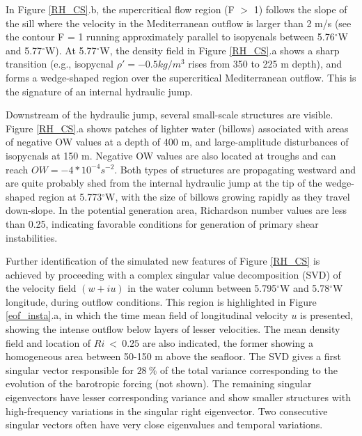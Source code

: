 In Figure \ref{RH_CS}.b, the supercritical flow region (F $>$ 1)  follows the slope of the sill where the velocity in the Mediterranean outflow is larger than 2 m/s (see the contour F = 1 running approximately parallel to isopycnals between 5.76$^\circ$W and 5.77$^\circ$W). At 5.77$^\circ$W, the density field in Figure \ref{RH_CS}.a shows a sharp transition (e.g., isopycnal $\rho'=-0.5kg/m^3$ rises from 350 to 225 m depth), and forms a wedge-shaped region over the supercritical Mediterranean outflow. This is the signature of an internal hydraulic jump. 

Downstream of the hydraulic jump, several small-scale structures are visible. Figure \ref{RH_CS}.a shows patches of lighter water (billows) associated with areas of negative OW values at a depth of 400 m, and large-amplitude disturbances of isopycnals at 150 m. Negative OW values are also located at troughs and can reach $OW=-4*10^{-4} s^{-2} $. Both types of structures are propagating westward and are quite probably shed from the internal hydraulic jump at the tip of the wedge-shaped region at 5.773$^\circ$W, with the size of billows growing rapidly as they travel down-slope. In the potential generation area, Richardson number values are less than 0.25, indicating favorable conditions for generation of primary shear instabilities. 

Further identification of the simulated new features of Figure \ref{RH_CS} is achieved by proceeding with a complex singular value decomposition (SVD) \citep{Pairaud2005} of the velocity field $(w+iu)$ in the water column between 5.795$^\circ$W and 5.78$^\circ$W longitude, during outflow conditions. This region is highlighted in Figure \ref{eof_insta}.a, in which the time mean field of longitudinal velocity $u$ is presented, showing the intense outflow below layers of lesser velocities. The mean density field and location of $Ri\ <\ 0.25$ are also indicated, the former showing a homogeneous area between 50-150 m above the seafloor. The SVD gives a first singular vector responsible for $28\ \%$ of the total variance corresponding to the evolution of the barotropic forcing (not shown). The remaining singular eigenvectors have lesser corresponding variance and show smaller structures with high-frequency variations in the singular right eigenvector. Two consecutive singular vectors often have very close eigenvalues and temporal variations.

